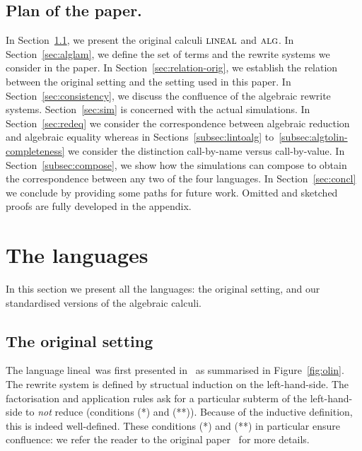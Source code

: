 \documentclass{LMCS}
\newcommand{\olin}{\mbox{\sc lineal}}
\newcommand{\oalg}{\mbox{\sc alg}}
\begin{document}
\subsection*{Plan of the paper.}
In Section~\ref{sec:originals}, we present the original calculi $\olin$ and $\oalg$.
In Section~\ref{sec:alglam}, we define the set of terms and the rewrite systems we consider in the paper.
In Section~\ref{sec:relation-orig}, we establish the relation between the original setting and the setting used in this paper.
In Section~\ref{sec:consistency}, we discuss the confluence 
of the algebraic rewrite systems. 
Section~\ref{sec:sim} is concerned with the actual simulations. In Section~\ref{sec:redeq} we consider the correspondence between algebraic reduction and algebraic equality whereas in Sections~\ref{subsec:lintoalg} to~\ref{subsec:algtolin-completeness} we consider the distinction call-by-name versus call-by-value. In Section~\ref{subsec:compose}, we show how the simulations can compose to obtain the correspondence between any two of the four languages. 
In Section~\ref{sec:concl} we conclude by providing some paths for future work.
Omitted and sketched proofs are fully developed in the appendix.


\section{The languages}
In this section we present all the languages: the original setting, and our standardised versions of the algebraic calculi.
\subsection{The original setting}\label{sec:originals}
The language \olin\ was first presented in~\cite{ArrighiDowekRTA08} as
summarised in Figure~\ref{fig:olin}. The rewrite system is defined by
structual induction on the left-hand-side. The factorisation and
application rules ask for a particular subterm of the left-hand-side
to {\em not} reduce (conditions (*) and (**)). Because of the
inductive definition, this is indeed well-defined.
These conditions (*) and (**) in particular ensure confluence: we
refer the reader to the original paper~\cite{ArrighiDowekRTA08} for
more details.
\end{document}
